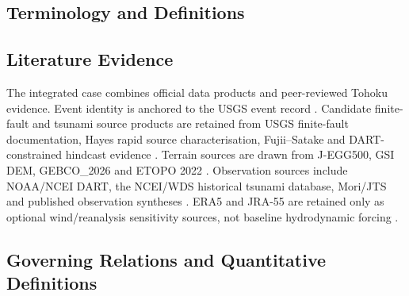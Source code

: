 \subsection{Terminology and Definitions}
\label{sec:res-dat-cas-definitions}


\subsection{Literature Evidence}
\label{sec:res-dat-cas-literature-evidence}

%

The integrated case combines official data products and peer-reviewed
Tohoku evidence. Event identity is anchored to the USGS event record
\parencite{usgs2011tohokuEvent}. Candidate finite-fault and tsunami
source products are retained from USGS finite-fault documentation,
Hayes rapid source characterisation, Fujii--Satake and DART-constrained
hindcast evidence
\parencite{usgsFiniteFaults,hayes2011rapid,fujii2011tsunamisource,wei2013japan}.
Terrain sources are drawn from J-EGG500, GSI DEM, GEBCO\_2026 and ETOPO
2022 \parencite{jodcJegg500,gsiDemDownload,gebco2026grid,noaa2022etopo}.
Observation sources include NOAA/NCEI DART, the NCEI/WDS historical
tsunami database, Mori/JTS and published observation syntheses
\parencite{noaa2005dart,noaa2011japanDart,noaaNceiHistoricalTsunami,mori2012nationwide,fine2013japan}.
ERA5 and JRA-55 are retained only as optional wind/reanalysis
sensitivity sources, not baseline hydrodynamic forcing
\parencite{copernicusEra5,jmaJra55}.

\subsection{Governing Relations and Quantitative Definitions}
\label{sec:res-dat-cas-governing-relations}

%


